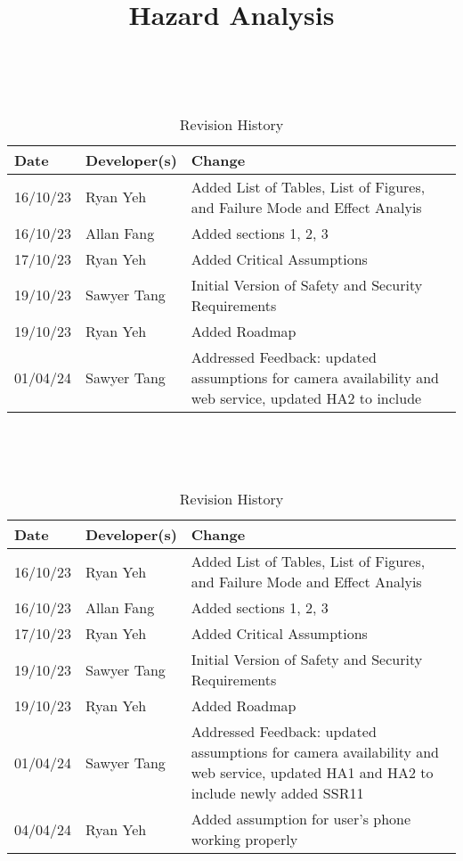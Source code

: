 \documentclass{article}
\title{Hazard Analysis\\\progname}
\author{\authname}
\date{}
\begin{document}
\maketitle
\thispagestyle{empty}

~\newpage


\begin{table}[hp]
\caption{Revision History} \label{TblRevisionHistory}
\begin{tabularx}{\textwidth}{llX}
\toprule
\textbf{Date} & \textbf{Developer(s)} & \textbf{Change}\\
\midrule
16/10/23 & Ryan Yeh & Added List of Tables, List of Figures, and Failure Mode and Effect Analyis\\
16/10/23 & Allan Fang & Added sections 1, 2, 3\\
17/10/23 & Ryan Yeh & Added Critical Assumptions\\
19/10/23 & Sawyer Tang & Initial Version of Safety and Security Requirements\\
19/10/23 & Ryan Yeh & Added Roadmap\\
01/04/24 & Sawyer Tang & Addressed Feedback: updated assumptions for camera availability and web service, updated HA2 to include\\
\bottomrule
\end{tabularx}
\end{table}

~\newpage

\tableofcontents

~\newpage

\listoftables

\listoffigures

\newpage


\begin{table}[hp]
\caption{Revision History} \label{TblRevisionHistory}
\begin{tabularx}{\textwidth}{llX}
\toprule
\textbf{Date} & \textbf{Developer(s)} & \textbf{Change}\\
\midrule
16/10/23 & Ryan Yeh & Added List of Tables, List of Figures, and Failure Mode and Effect Analyis\\
16/10/23 & Allan Fang & Added sections 1, 2, 3\\
17/10/23 & Ryan Yeh & Added Critical Assumptions\\
19/10/23 & Sawyer Tang & Initial Version of Safety and Security Requirements\\
19/10/23 & Ryan Yeh & Added Roadmap\\
01/04/24 & Sawyer Tang & Addressed Feedback: updated assumptions for camera availability and web service, updated HA1 and HA2 to include newly added SSR11\\
04/04/24 & Ryan Yeh & Added assumption for user's phone working properly\\
\bottomrule
\end{tabularx}
\end{table}
\end{document}
